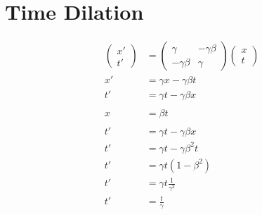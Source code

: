 \documentclass[11pt,letterpaper, twocolumn]{article}
\begin{document}
\section{Time Dilation}
\begin{align*}
    \begin{pmatrix}x'\\t'\end{pmatrix} &= \begin{pmatrix}\gamma & -\gamma\beta\\ -\gamma\beta & \gamma\end{pmatrix}\begin{pmatrix}x\\t\end{pmatrix} \\
    x'&= \gamma x - \gamma\beta t\\
    t'&= \gamma t - \gamma\beta x\\\\
    x&=\beta t\\\\
    t' &= \gamma t - \gamma\beta x\\
    t' &= \gamma t - \gamma\beta^2 t\\
    t' &= \gamma t (1 - \beta^2)\\
    t' &= \gamma t \frac{1}{\gamma^2}\\
    t' &= \frac{t}{\gamma}\\
\end{align*}
\end{document}
